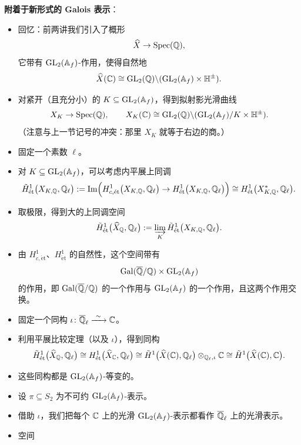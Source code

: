 \noindent\textbf{附着于新形式的 Galois 表示}：
\begin{itemize}
\item 回忆：前两讲我们引入了概形
\[
\widehat X\to\operatorname{Spec}(\mathbb{Q}),
\]
它带有 $\operatorname{GL}_2(\mathbb{A}_f)$-作用，使得自然地
\[
\widehat X(\mathbb{C})\cong\operatorname{GL}_2(\mathbb{Q})\backslash(\operatorname{GL}_2(\mathbb{A}_f)\times\mathbb{H}^\pm).
\]
\item 对紧开（且充分小）的 $K\subseteq\operatorname{GL}_2(\mathbb{A}_f)$，得到拟射影光滑曲线
\[
X_K\to\operatorname{Spec}(\mathbb{Q}),\qquad X_K(\mathbb{C})\cong\operatorname{GL}_2(\mathbb{Q})\backslash(\operatorname{GL}_2(\mathbb{A}_f)/K\times\mathbb{H}^\pm).
\]
（注意与上一节记号的冲突：那里 $X_K$ 就等于右边的商。）
\item 固定一个素数 $\ell$。
\item 对 $K\subseteq\operatorname{GL}_2(\mathbb{A}_f)$，可以考虑内平展上同调
\[
\tilde H^1_{\mathrm{\acute{e}t}}\bigl(X_{K,\mathbb{Q}},\mathbb{Q}_\ell\bigr):=\operatorname{Im}\Bigl(H^1_{c,\mathrm{\acute{e}t}}\bigl(X_{K,\mathbb{Q}},\mathbb{Q}_\ell\bigr)\to H^1_{\mathrm{\acute{e}t}}\bigl(X_{K,\mathbb{Q}},\mathbb{Q}_\ell\bigr)\Bigr)\cong H^1_{\mathrm{\acute{e}t}}\bigl(X^*_{K,\mathbb{Q}},\mathbb{Q}_\ell\bigr).
\]
\item 取极限，得到大的上同调空间
\[
\tilde H^1_{\mathrm{\acute{e}t}}\bigl(\widehat X_{\mathbb{Q}},\mathbb{Q}_\ell\bigr):=\varinjlim_{K}\tilde H^1_{\mathrm{\acute{e}t}}\bigl(X_{K,\mathbb{Q}},\mathbb{Q}_\ell\bigr).
\]
\item 由 $H^1_{c,\mathrm{\acute{e}t}}$、$H^1_{\mathrm{\acute{e}t}}$ 的自然性，这个空间带有
\[
\operatorname{Gal}(\overline{\mathbb{Q}}/\mathbb{Q})\times\operatorname{GL}_2(\mathbb{A}_f)
\]
的作用，即 $\operatorname{Gal}(\overline{\mathbb{Q}}/\mathbb{Q})$ 的一个作用与 $\operatorname{GL}_2(\mathbb{A}_f)$ 的一个作用，且这两个作用交换。
\item 固定一个同构 $\iota\colon\Ql\xrightarrow{\ \sim\ }\C$。
\item 利用平展比较定理（以及 $\iota$），得到同构
\[
\tilde H^1_{\mathrm{\acute{e}t}}\bigl(\widehat X_{\mathbb{Q}},\mathbb{Q}_\ell\bigr)\cong H^1_{\mathrm{\acute{e}t}}\bigl(\widehat X_{\mathbb{C}},\mathbb{Q}_\ell\bigr)\cong\tilde H^1\bigl(\widehat X(\mathbb{C}),\mathbb{Q}_\ell\bigr)\otimes_{\mathbb{Q}_\ell,\iota}\mathbb{C}\cong\tilde H^1\bigl(\widehat X(\mathbb{C}),\mathbb{C}\bigr).
\]
\item 这些同构都是 $\operatorname{GL}_2(\mathbb{A}_f)$-等变的。
\item 设 $\pi\subseteq S_2$ 为不可约 $\operatorname{GL}_2(\mathbb{A}_f)$-表示。
\item 借助 $\iota$，我们把每个 $\mathbb{C}$ 上的光滑 $\operatorname{GL}_2(\mathbb{A}_f)$-表示都看作 $\overline{\mathbb{Q}}_\ell$ 上的光滑表示。
\item 空间

\end{itemize}
